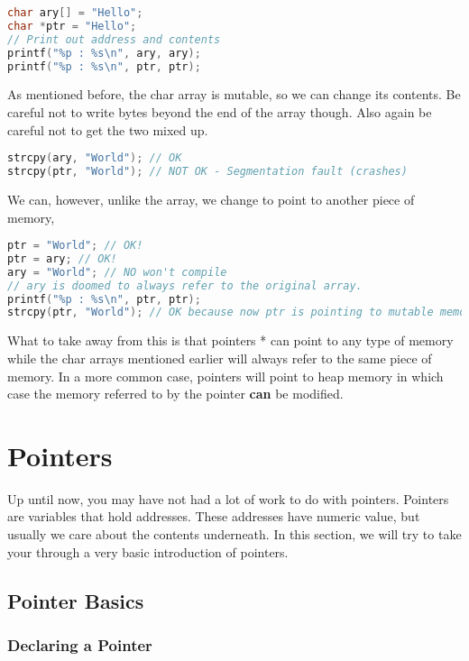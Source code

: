 \begin{lstlisting}[language=C]
char ary[] = "Hello";
char *ptr = "Hello";
// Print out address and contents
printf("%p : %s\n", ary, ary);
printf("%p : %s\n", ptr, ptr);
\end{lstlisting}

As mentioned before, the char array is mutable, so we can change its contents.
Be careful not to write bytes beyond the end of the array though.
Also again be careful not to get the two mixed up.

\begin{lstlisting}[language=C]
strcpy(ary, "World"); // OK
strcpy(ptr, "World"); // NOT OK - Segmentation fault (crashes)
\end{lstlisting}

We can, however, unlike the array, we change  to point to another piece of memory,

\begin{lstlisting}[language=C]
ptr = "World"; // OK!
ptr = ary; // OK!
ary = "World"; // NO won't compile
// ary is doomed to always refer to the original array.
printf("%p : %s\n", ptr, ptr);
strcpy(ptr, "World"); // OK because now ptr is pointing to mutable memory (the array)
\end{lstlisting}

What to take away from this is that pointers * can point to any type of memory while the char arrays mentioned earlier will always refer to the same piece of memory.
In a more common case, pointers will point to heap memory in which case the memory referred to by the pointer \textbf{can} be modified.

\section{Pointers}

Up until now, you may have not had a lot of work to do with pointers. Pointers are variables that hold addresses.
These addresses have numeric value, but usually we care about the contents underneath.
In this section, we will try to take your through a very basic introduction of pointers.

\subsection{Pointer Basics}

\subsubsection{Declaring a Pointer}

